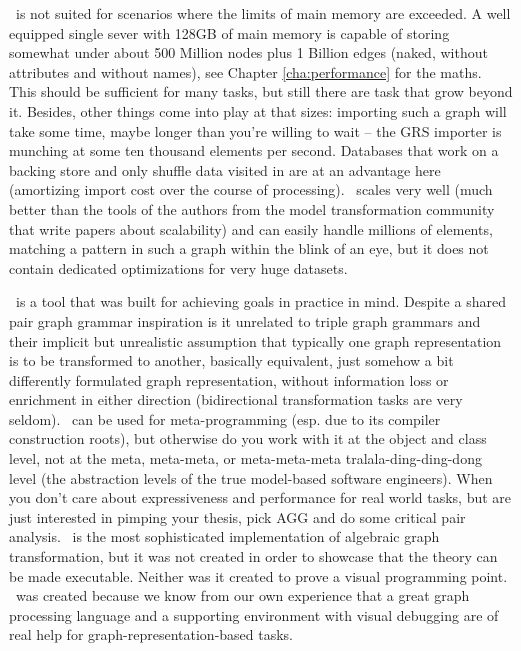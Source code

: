 \GrG\ is not suited for scenarios where the limits of main memory are exceeded.
A well equipped single sever with 128GB of main memory is capable of storing somewhat under about 500 Million nodes plus 1 Billion edges (naked, without attributes and without names), see Chapter \ref{cha:performance} for the maths.
This should be sufficient for many tasks, but still there are task that grow beyond it.
Besides, other things come into play at that sizes: importing such a graph will take some time, maybe longer than you're willing to wait -- the GRS importer is munching at some ten thousand elements per second.
Databases that work on a backing store and only shuffle data visited in are at an advantage here (amortizing import cost over the course of processing).
\GrG\ scales very well (much better than the tools of the authors from the model transformation community that write papers about scalability) and can easily handle millions of elements, matching a pattern in such a graph within the blink of an eye, but it does not contain dedicated optimizations for very huge datasets.

\GrG\ is a tool that was built for achieving goals in practice in mind.
Despite a shared pair graph grammar inspiration is it unrelated to triple graph grammars and their implicit but unrealistic assumption that typically one graph representation is to be transformed to another, basically equivalent, just somehow a bit differently formulated graph representation, without information loss or enrichment in either direction (bidirectional transformation tasks are very seldom).
\GrG\ can be used for meta-programming (esp. due to its compiler construction roots), but otherwise do you work with it at the object and class level, not at the meta, meta-meta, or meta-meta-meta tralala-ding-ding-dong level (the abstraction levels of the true model-based software engineers).
When you don't care about expressiveness and performance for real world tasks, but are just interested in pimping your thesis, pick AGG and do some critical pair analysis.
\GrG\ is the most sophisticated implementation of algebraic graph transformation, but it was not created in order to showcase that the theory can be made executable.
Neither was it created to prove a visual programming point.
\GrG\ was created because we know from our own experience that a great graph processing language and a supporting environment with visual debugging are of real help for graph-representation-based tasks.
